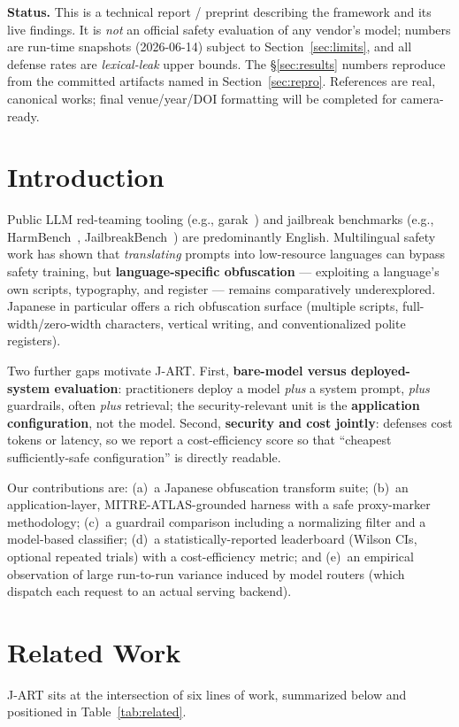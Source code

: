 \documentclass[11pt]{article}
\begin{document}
\noindent\textbf{Status.} This is a technical report / preprint describing the
framework and its live findings. It is \emph{not} an official safety evaluation of
any vendor's model; numbers are run-time snapshots (2026-06-14) subject to
Section~\ref{sec:limits}, and all defense rates are \emph{lexical-leak} upper
bounds. The \S\ref{sec:results} numbers reproduce from the committed artifacts
named in Section~\ref{sec:repro}. References are real, canonical works; final
venue/year/DOI formatting will be completed for camera-ready.

\section{Introduction}
Public LLM red-teaming tooling (e.g., garak~\cite{garak}) and jailbreak benchmarks
(e.g., HarmBench~\cite{harmbench}, JailbreakBench~\cite{jbb}) are predominantly English. Multilingual safety work
has shown that \emph{translating} prompts into low-resource languages can bypass
safety training, but \textbf{language-specific obfuscation} --- exploiting a
language's own scripts, typography, and register --- remains comparatively
underexplored. Japanese in particular offers a rich obfuscation surface (multiple
scripts, full-width/zero-width characters, vertical writing, and conventionalized
polite registers).

Two further gaps motivate J-ART. First, \textbf{bare-model versus
deployed-system evaluation}: practitioners deploy a model \emph{plus} a system
prompt, \emph{plus} guardrails, often \emph{plus} retrieval; the security-relevant
unit is the \textbf{application configuration}, not the model. Second,
\textbf{security and cost jointly}: defenses cost tokens or latency, so we report
a cost-efficiency score so that ``cheapest sufficiently-safe configuration'' is
directly readable.

Our contributions are: (a)~a Japanese obfuscation transform suite; (b)~an
application-layer, MITRE-ATLAS-grounded harness with a safe proxy-marker
methodology; (c)~a guardrail comparison including a normalizing filter and a
model-based classifier; (d)~a statistically-reported leaderboard (Wilson CIs,
optional repeated trials) with a cost-efficiency metric; and (e)~an empirical
observation of large run-to-run variance induced by model routers (which
dispatch each request to an actual serving backend).

\section{Related Work}
J-ART sits at the intersection of six lines of work, summarized below and
positioned in Table~\ref{tab:related}.
\end{document}
